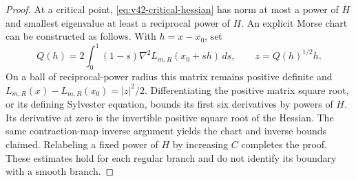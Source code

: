 \begin{proof}
At a critical point, \eqref{eq:v42-critical-hessian} has norm at most
a power of $H$ and smallest eigenvalue at least a reciprocal power
of $H$. An explicit Morse chart can be constructed as follows. With
$h=x-x_0$, set
\[
 Q(h)=2\int_0^1(1-s)\nabla^2L_{m,R}(x_0+sh)\,ds,
 \qquad z=Q(h)^{1/2}h.
\]
On a ball of reciprocal-power radius this matrix remains positive
definite and $L_{m,R}(x)-L_{m,R}(x_0)=|z|^2/2$.
Differentiating the positive matrix square root, or its defining
Sylvester equation, bounds its first six derivatives by powers of
$H$. Its derivative at zero is the invertible positive square root
of the Hessian. The same contraction-map inverse argument yields the
chart and inverse bounds claimed. Relabeling a fixed power of $H$
by increasing $C$ completes the proof. These estimates hold for each
regular branch and do not identify its boundary with a smooth branch.
\end{proof}

